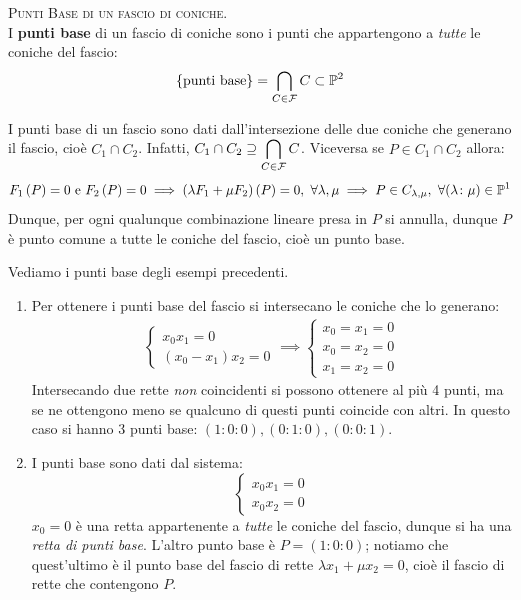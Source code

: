 \begin{define} \textsc{Punti Base di un fascio di coniche.}\\
	I \textbf{punti base} di un fascio di coniche sono i punti che appartengono a \textit{tutte} le coniche del fascio:
		\begin{equation}
			\{\text{punti base}\}=\inter_{C\in\mathcal{F}} C \subset \proj[2]{\ }
		\end{equation}
	\vspace{-3mm}
\end{define}
\begin{observe}	I punti base di un fascio sono dati dall'intersezione delle due coniche che generano il fascio, cioè $C_1\cap C_2$. Infatti, $\displaystyle C_1\cap C_2 \supseteq \mathop{{\bigcap}}\displaylimits_{C\in\mathcal{F}} C$. Viceversa se $P\in C_1\cap C_2$ allora:
	\begin{equation*}
		F_1\left(P\right)=0\text{ e }F_2\left(P\right)=0 \implies (\lambda F_1 +\mu F_2)\left(P\right)=0,\ \forall\lambda,\mu \implies P\in C_{\lambda,\mu},\ \forall (\lambda\colon\mu)\in\proj[1]{\ }
	\end{equation*}
Dunque, per ogni qualunque combinazione lineare presa in $P$ si annulla, dunque $P$ è punto comune a tutte le coniche del fascio, cioè un punto base.
\end{observe}
Vediamo i punti base degli esempi precedenti.
\begin{examples}
	\begin{enumerate}
		\item	Per ottenere i punti base del fascio si intersecano le coniche che lo generano:
			\begin{gather*}
				\begin{cases}
					x_0x_1=0\\
					(x_0-x_1)x_2=0
				\end{cases} \implies \begin{cases}
					x_0=x_1=0\\
					x_0=x_2=0\\
					x_1=x_2=0
				\end{cases}
			\end{gather*}
		Intersecando due rette \textit{non} coincidenti si possono ottenere al più 4 punti, ma se ne ottengono meno se qualcuno di questi punti coincide con altri. In questo caso si hanno 3 punti base: $(1\colon 0\colon 0),(0\colon 1\colon 0), (0\colon 0\colon 1)$.
		\item	I punti base sono dati dal sistema:
		\begin{equation*}
			\begin{cases} x_0x_1=0\\ x_0x_2=0 \end{cases}
		\end{equation*}
		$x_0=0$ è una retta appartenente a \textit{tutte} le coniche del fascio, dunque si ha una \textit{retta di punti base}. L'altro punto base è $P=(1\colon 0\colon 0)$; notiamo che quest'ultimo è il punto base del fascio di rette $\lambda x_1+\mu x_2=0$, cioè il fascio di rette che contengono $P$.
	\end{enumerate}
\end{examples}
